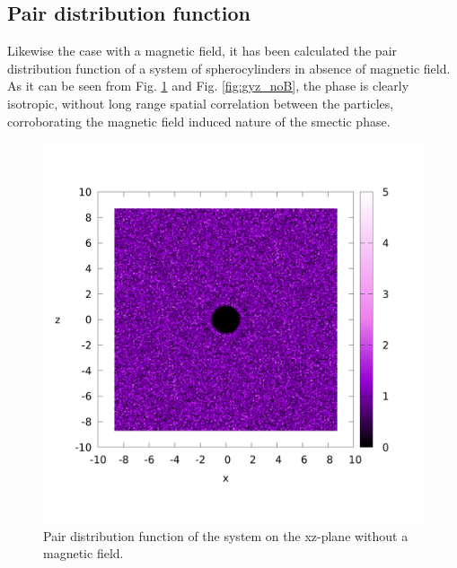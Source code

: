 \documentclass{article}
\begin{document}
\subsection{Pair distribution function}

Likewise the case with a magnetic field, it has been calculated the pair distribution function of a system of spherocylinders in absence of magnetic field. As it can be seen from Fig. \ref{fig:gxz_noB} and Fig. \ref{fig:gyz_noB}, the phase is clearly isotropic, without long range spatial correlation between the particles, corroborating the magnetic field induced nature of the smectic phase.


\begin{figure}
    \centering
    \includegraphics[width=1\columnwidth]{gxz_noB.png}
    \caption{Pair distribution function of the system on the xz-plane without a magnetic field.}
    \label{fig:gxz_noB}
\end{figure}
\end{document}
